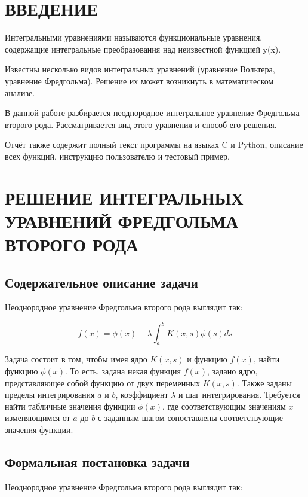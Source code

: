 

\setcounter{page}{2}
\normalfont
\tableofcontents
\clearpage
\section*{ВВЕДЕНИЕ}
Интегральными уравнениями называются функциональные уравнения, содержащие интегральные преобразования над неизвестной функцией y(x). 

Известны несколько видов интегральных уравнений (уравнение Вольтера, уравнение Фредгольма). Решение их может возникнуть в математическом анализе.

В данной работе разбирается неоднородное интегральное уравнение Фредгольма второго рода. Рассматривается вид этого уравнения и способ его решения.  

Отчёт также содержит полный текст программы на языках C и Python, описание всех функций, инструкцию пользователю и тестовый пример. 

\clearpage
\section{РЕШЕНИЕ ИНТЕГРАЛЬНЫХ УРАВНЕНИЙ ФРЕДГОЛЬМА ВТОРОГО РОДА}
\subsection{Содержательное описание задачи}
Неоднородное уравнение Фредгольма второго рода выглядит так:

$$f(x)=\phi(x)-\lambda \int_a^b K(x,s)\phi(s)ds$$

Задача состоит в том, чтобы имея ядро $K(x,s)$ и функцию $f(x)$, найти функцию $\phi(x)$. То есть, задана некая функция $f(x)$, задано ядро, представляющее собой функцию от двух переменных $K(x,s)$. Также заданы пределы интегрирования $a$ и $b$, коэффициент $\lambda$ и шаг интегрирования. Требуется найти табличные значения функции $\phi(x)$, где соответствующим значениям $x$ изменяющимся от $a$ до $b$ с заданным шагом сопоставлены соответствующие значения функции.

\subsection{Формальная постановка задачи}
Неоднородное уравнение Фредгольма второго рода выглядит так:

